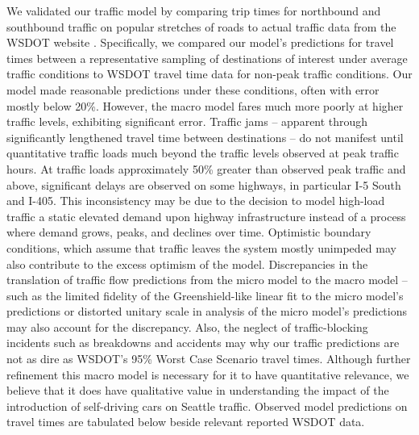 We validated our traffic model by comparing trip times for northbound and southbound traffic on popular stretches of roads to actual traffic data from the WSDOT website \cite{WSDOT2017WSDOTTimes}. Specifically, we compared our model's predictions for travel times between a representative sampling of destinations of interest under average traffic conditions to WSDOT travel time data for non-peak traffic conditions. Our model made reasonable predictions under these conditions, often with error mostly below 20\%. However, the macro model fares much more poorly at higher traffic levels, exhibiting significant error. Traffic jams -- apparent through significantly lengthened travel time between destinations -- do not manifest until quantitative traffic loads much beyond the traffic levels observed at peak traffic hours. At traffic loads approximately 50\% greater than observed peak traffic and above, significant delays are observed on some highways, in particular I-5 South and I-405. This inconsistency may be due to the decision to model high-load traffic a static elevated demand upon highway infrastructure instead of a process where demand grows, peaks, and declines over time. Optimistic boundary conditions, which assume that traffic leaves the system mostly unimpeded may also contribute to the excess optimism of the model. Discrepancies in the translation of traffic flow predictions from the micro model to the macro model -- such as the limited fidelity of the Greenshield-like linear fit to the micro model's predictions or distorted unitary scale in analysis of the micro model's predictions may also account for the discrepancy. Also, the neglect of traffic-blocking incidents such as breakdowns and accidents may why our traffic predictions are not as dire as WSDOT's 95\% Worst Case Scenario travel times. Although further refinement this macro model is necessary for it to have quantitative relevance, we believe that it does have qualitative value in understanding the impact of the introduction of self-driving cars on Seattle traffic. Observed model predictions on travel times are tabulated below beside relevant reported WSDOT data.

\vspace{12pt}

